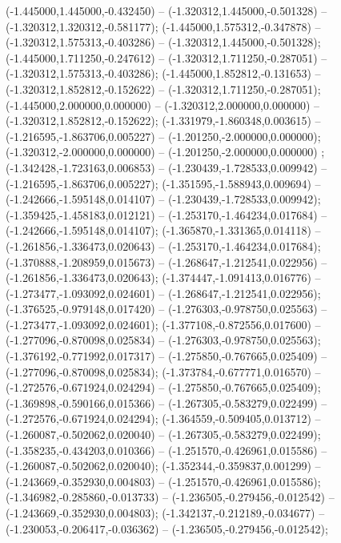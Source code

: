  (-1.445000,1.445000,-0.432450) -- (-1.320312,1.445000,-0.501328) -- (-1.320312,1.320312,-0.581177);
 (-1.445000,1.575312,-0.347878) -- (-1.320312,1.575313,-0.403286) -- (-1.320312,1.445000,-0.501328);
 (-1.445000,1.711250,-0.247612) -- (-1.320312,1.711250,-0.287051) -- (-1.320312,1.575313,-0.403286);
 (-1.445000,1.852812,-0.131653) -- (-1.320312,1.852812,-0.152622) -- (-1.320312,1.711250,-0.287051);
 (-1.445000,2.000000,0.000000) -- (-1.320312,2.000000,0.000000) -- (-1.320312,1.852812,-0.152622);
 (-1.331979,-1.860348,0.003615) -- (-1.216595,-1.863706,0.005227) -- (-1.201250,-2.000000,0.000000);
 (-1.320312,-2.000000,0.000000) -- (-1.201250,-2.000000,0.000000) ;
 (-1.342428,-1.723163,0.006853) -- (-1.230439,-1.728533,0.009942) -- (-1.216595,-1.863706,0.005227);
 (-1.351595,-1.588943,0.009694) -- (-1.242666,-1.595148,0.014107) -- (-1.230439,-1.728533,0.009942);
 (-1.359425,-1.458183,0.012121) -- (-1.253170,-1.464234,0.017684) -- (-1.242666,-1.595148,0.014107);
 (-1.365870,-1.331365,0.014118) -- (-1.261856,-1.336473,0.020643) -- (-1.253170,-1.464234,0.017684);
 (-1.370888,-1.208959,0.015673) -- (-1.268647,-1.212541,0.022956) -- (-1.261856,-1.336473,0.020643);
 (-1.374447,-1.091413,0.016776) -- (-1.273477,-1.093092,0.024601) -- (-1.268647,-1.212541,0.022956);
 (-1.376525,-0.979148,0.017420) -- (-1.276303,-0.978750,0.025563) -- (-1.273477,-1.093092,0.024601);
 (-1.377108,-0.872556,0.017600) -- (-1.277096,-0.870098,0.025834) -- (-1.276303,-0.978750,0.025563);
 (-1.376192,-0.771992,0.017317) -- (-1.275850,-0.767665,0.025409) -- (-1.277096,-0.870098,0.025834);
 (-1.373784,-0.677771,0.016570) -- (-1.272576,-0.671924,0.024294) -- (-1.275850,-0.767665,0.025409);
 (-1.369898,-0.590166,0.015366) -- (-1.267305,-0.583279,0.022499) -- (-1.272576,-0.671924,0.024294);
 (-1.364559,-0.509405,0.013712) -- (-1.260087,-0.502062,0.020040) -- (-1.267305,-0.583279,0.022499);
 (-1.358235,-0.434203,0.010366) -- (-1.251570,-0.426961,0.015586) -- (-1.260087,-0.502062,0.020040);
 (-1.352344,-0.359837,0.001299) -- (-1.243669,-0.352930,0.004803) -- (-1.251570,-0.426961,0.015586);
 (-1.346982,-0.285860,-0.013733) -- (-1.236505,-0.279456,-0.012542) -- (-1.243669,-0.352930,0.004803);
 (-1.342137,-0.212189,-0.034677) -- (-1.230053,-0.206417,-0.036362) -- (-1.236505,-0.279456,-0.012542);
